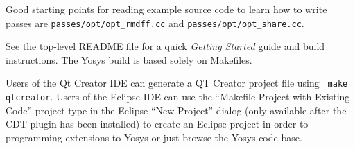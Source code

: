 Good starting points for reading example source code to learn how to write passes
are {\tt passes/opt/opt\_rmdff.cc} and {\tt passes/opt/opt\_share.cc}.

See the top-level README file for a quick {\it Getting Started} guide and build
instructions. The Yosys build is based solely on Makefiles.

Users of the Qt Creator IDE can generate a QT Creator project file using {\tt
make qtcreator}. Users of the Eclipse IDE can use the ``Makefile Project with
Existing Code'' project type in the Eclipse ``New Project'' dialog (only
available after the CDT plugin has been installed) to create an Eclipse project
in order to programming extensions to Yosys or just browse the Yosys code base.

